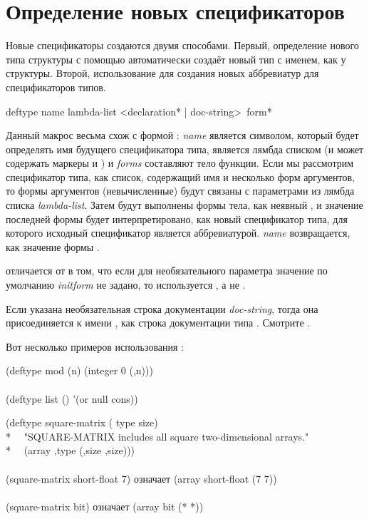 \section{Определение новых спецификаторов}

Новые спецификаторы создаются двумя способами.
Первый, определение нового типа структуры с помощью  автоматически
создаёт новый тип с именем, как у структуры.
Второй, использование  для создания новых аббревиатур для
спецификаторов типов.

\begin{defmac}
deftype name lambda-list <{declaration}* | doc-string> {\,form}*

Данный макрос весьма схож с формой : \emph{name} является
символом, который будет определять имя будущего спецификатора типа,
 является лямбда списком (и может содержать маркеры  и
) и \emph{forms} составляют тело функции. Если мы рассмотрим
спецификатор типа, как список, содержащий имя и несколько форм аргументов, то
формы аргументов (невычисленные) будут связаны с параметрами из лямбда списка
\emph{lambda-list}. Затем будут выполнены формы тела, как неявный ,
и значение последней формы будет интерпретировано, как новый спецификатор типа,
для которого исходный спецификатор является аббревиатурой. \emph{name}
возвращается, как значение формы .

 отличается от  в том, что если для необязательного 
параметра значение по умолчанию \emph{initform} не задано, то используется
\cdf{*}, а не {\nil}.

Если указана необязательная строка документации \emph{doc-string}, тогда она
присоединяется к имени , как строка документации типа .
Смотрите .

Вот несколько примеров использования :
\begin{lisp}
(deftype mod (n) {\Xbq}(integer 0 (,n))) \\
 \\
(deftype list () '(or null cons))
\end{lisp}

\begin{lisp}
(deftype square-matrix ( type size) \\*
~~"SQUARE-MATRIX includes all square two-dimensional arrays." \\*
~~{\Xbq}(array ,type (,size ,size))) \\
 \\
(square-matrix short-float 7)  \textrm{означает}  (array short-float (7 7)) \\
 \\
(square-matrix bit)  \textrm{означает}  (array bit (* *))
\end{lisp}


\end{defmac}

